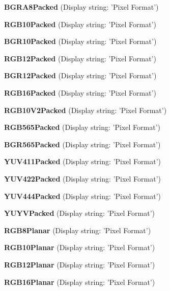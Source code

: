 \begin{DoxyItemize}
\item {\bfseries B\+G\+R\+A8\+Packed} (Display string\+: 'Pixel Format')
\item {\bfseries R\+G\+B10\+Packed} (Display string\+: 'Pixel Format')
\item {\bfseries B\+G\+R10\+Packed} (Display string\+: 'Pixel Format')
\item {\bfseries R\+G\+B12\+Packed} (Display string\+: 'Pixel Format')
\item {\bfseries B\+G\+R12\+Packed} (Display string\+: 'Pixel Format')
\item {\bfseries R\+G\+B16\+Packed} (Display string\+: 'Pixel Format')
\item {\bfseries R\+G\+B10\+V2\+Packed} (Display string\+: 'Pixel Format')
\item {\bfseries R\+G\+B565\+Packed} (Display string\+: 'Pixel Format')
\item {\bfseries B\+G\+R565\+Packed} (Display string\+: 'Pixel Format')
\item {\bfseries Y\+U\+V411\+Packed} (Display string\+: 'Pixel Format')
\item {\bfseries Y\+U\+V422\+Packed} (Display string\+: 'Pixel Format')
\item {\bfseries Y\+U\+V444\+Packed} (Display string\+: 'Pixel Format')
\item {\bfseries Y\+U\+Y\+V\+Packed} (Display string\+: 'Pixel Format')
\item {\bfseries R\+G\+B8\+Planar} (Display string\+: 'Pixel Format')
\item {\bfseries R\+G\+B10\+Planar} (Display string\+: 'Pixel Format')
\item {\bfseries R\+G\+B12\+Planar} (Display string\+: 'Pixel Format')
\item {\bfseries R\+G\+B16\+Planar} (Display string\+: 'Pixel Format')
\end{DoxyItemize}

